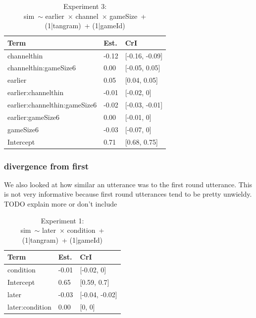 \documentclass[
  english,
  a4paper,
]{article}
\begin{document}
\begin{table}[h!]

\caption{\label{tab:unnamed-chunk-15}Experiment 3:\\ sim~$\sim$ earlier~$\times$ channel~$\times$ gameSize~+ (1|tangram)~+ (1|gameId)}
\centering
\begin{tabular}[t]{lll}
\toprule
Term & Est. & CrI\\
\midrule
channelthin & -0.12 & {}[-0.16, -0.09]\\
channelthin:gameSize6 & 0.00 & {}[-0.05, 0.05]\\
earlier & 0.05 & {}[0.04, 0.05]\\
earlier:channelthin & -0.01 & {}[-0.02, 0]\\
earlier:channelthin:gameSize6 & -0.02 & {}[-0.03, -0.01]\\
\addlinespace
earlier:gameSize6 & 0.00 & {}[-0.01, 0]\\
gameSize6 & -0.03 & {}[-0.07, 0]\\
Intercept & 0.71 & {}[0.68, 0.75]\\
\bottomrule
\end{tabular}
\end{table}

\pagebreak

\hypertarget{divergence-from-first}{%
\subsubsection{divergence from first}\label{divergence-from-first}}

We also looked at how similar an utterance was to the first round utterance. This is not very informative because first round utterances tend to be pretty unwieldy. TODO explain more or don't include

\begin{table}[h!]

\caption{\label{tab:unnamed-chunk-16}Experiment 1:\\ sim~$\sim$ later~$\times$ condition~+ (1|tangram)~+ (1|gameId)}
\centering
\begin{tabular}[t]{lll}
\toprule
Term & Est. & CrI\\
\midrule
condition & -0.01 & {}[-0.02, 0]\\
Intercept & 0.65 & {}[0.59, 0.7]\\
later & -0.03 & {}[-0.04, -0.02]\\
later:condition & 0.00 & {}[0, 0]\\
\bottomrule
\end{tabular}
\end{table}
\end{document}
